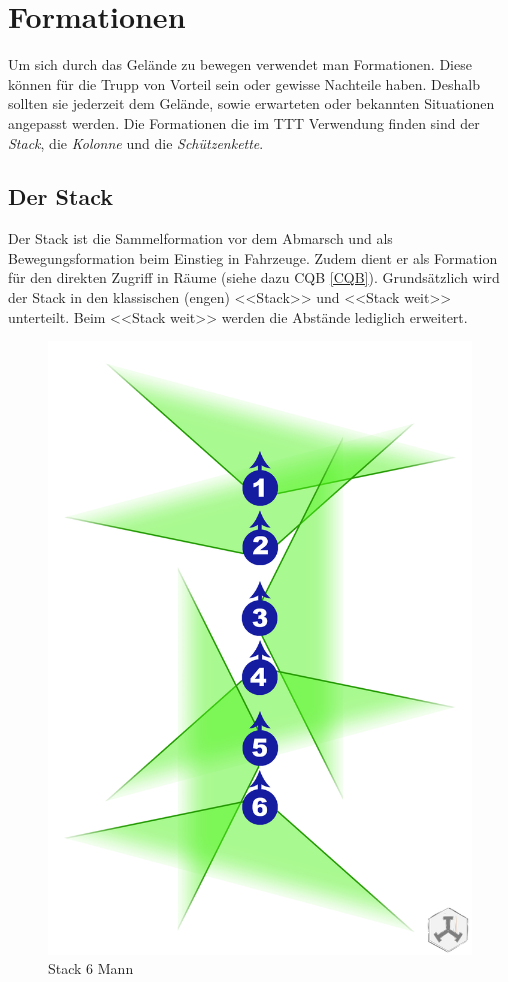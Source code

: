 \section{Formationen}
Um sich durch das Gelände zu bewegen verwendet man Formationen. Diese können für die Trupp von Vorteil sein oder gewisse Nachteile haben. Deshalb sollten sie jederzeit dem Gelände, sowie erwarteten oder bekannten Situationen angepasst werden. Die Formationen die im TTT Verwendung finden sind der \textit{Stack}, die \textit{Kolonne} und die \textit{Schützenkette}. 

\subsection{Der Stack}
Der Stack ist die Sammelformation vor dem Abmarsch und als Bewegungsformation beim Einstieg in Fahrzeuge. Zudem dient er als Formation für den direkten Zugriff in Räume (siehe dazu CQB \autoref{CQB}). Grundsätzlich wird der Stack in den klassischen (engen) <<Stack>> und <<Stack weit>> unterteilt. Beim <<Stack weit>> werden die Abstände lediglich erweitert.
\begin{figure}[!htb]
	\centering
	\includegraphics[width=0.5\linewidth]{./img/grundlagen/formationen/stack_6mann.jpg}
	\caption{Stack 6 Mann}
\end{figure}\\
\label{Kolonne}
